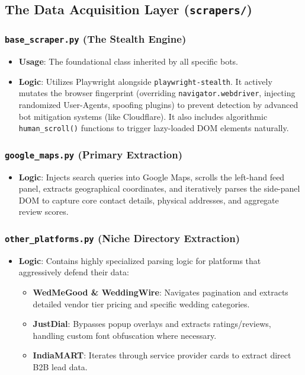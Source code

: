 \documentclass[12pt,a4paper]{article}
\begin{document}
\subsection{The Data Acquisition Layer (\texttt{scrapers/})}

\subsubsection{\texttt{base\_scraper.py} (The Stealth Engine)}
\begin{itemize}
    \item \textbf{Usage}: The foundational class inherited by all specific bots.
    \item \textbf{Logic}: Utilizes Playwright alongside \texttt{playwright-stealth}. It actively mutates the browser fingerprint (overriding \texttt{navigator.webdriver}, injecting randomized User-Agents, spoofing plugins) to prevent detection by advanced bot mitigation systems (like Cloudflare). It also includes algorithmic \texttt{human\_scroll()} functions to trigger lazy-loaded DOM elements naturally.
\end{itemize}

\subsubsection{\texttt{google\_maps.py} (Primary Extraction)}
\begin{itemize}
    \item \textbf{Logic}: Injects search queries into Google Maps, scrolls the left-hand feed panel, extracts geographical coordinates, and iteratively parses the side-panel DOM to capture core contact details, physical addresses, and aggregate review scores.
\end{itemize}

\subsubsection{\texttt{other\_platforms.py} (Niche Directory Extraction)}
\begin{itemize}
    \item \textbf{Logic}: Contains highly specialized parsing logic for platforms that aggressively defend their data:
    \begin{itemize}
        \item \textbf{WedMeGood \& WeddingWire}: Navigates pagination and extracts detailed vendor tier pricing and specific wedding categories.
        \item \textbf{JustDial}: Bypasses popup overlays and extracts ratings/reviews, handling custom font obfuscation where necessary.
        \item \textbf{IndiaMART}: Iterates through service provider cards to extract direct B2B lead data.
    \end{itemize}
\end{itemize}
\end{document}
